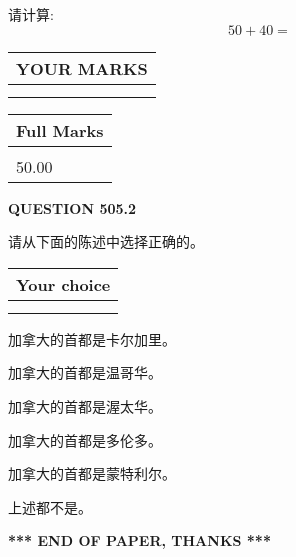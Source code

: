 \documentclass{ctexart}
\begin{document}
  
 
请计算:
\begin{equation}
50 +  %
40 = \nonumber
\end{equation}
 

 

 
  
\vspace{0.2in}
  
\noindent\begin{tabular}{|l|}
\hline
 YOUR MARKS  \\
\hline
 \\ 
 \\ 
\hline
\end{tabular}
\hspace{0.05in} \begin{tabular}{|l|}
\hline
 Full Marks  \\
\hline
 \\ 
50.00 \\
\hline
\end{tabular}
{\textbf{\Large{QUESTION
505.2 
}}}
  
  
请从下面的陈述中选择正确的。
  
  
\noindent\hspace{3.0in} \begin{tabular}{|l|}
\hline
Your choice \\
\hline
 \\ 
 \\ 
\hline
\end{tabular}
  
  
 
 
加拿大的首都是卡尔加里。
 
 
加拿大的首都是温哥华。
 
 
加拿大的首都是渥太华。
 
 
加拿大的首都是多伦多。
 
 
加拿大的首都是蒙特利尔。
 
 
 上述都不是。
 
 
   
   
 \vspace{0.2in}
 
   
   
   
   
\vspace{1.0in} 
{\textbf{\large{ *** END OF PAPER, THANKS *** }}} 
   
\end{document}
